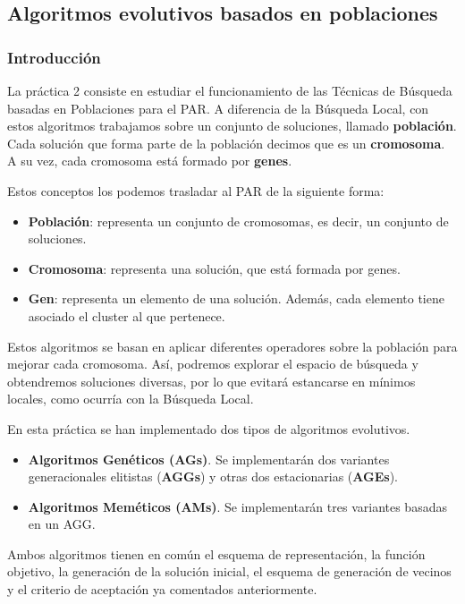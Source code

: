 	\subsection{Algoritmos evolutivos basados en poblaciones}
		\subsubsection{Introducción}
		La práctica 2 consiste en estudiar el funcionamiento de las Técnicas de Búsqueda basadas en Poblaciones para el PAR.
		A diferencia de la Búsqueda Local, con estos algoritmos trabajamos sobre un conjunto de soluciones, llamado \textbf{población}.
		Cada solución que forma parte de la población decimos que es un \textbf{cromosoma}. A su vez, cada cromosoma está formado por \textbf{genes}.
		

		Estos conceptos los podemos trasladar al PAR de la siguiente forma:

		\begin{itemize}
			\item \textbf{Población}: representa un conjunto de cromosomas, es decir, un conjunto de soluciones.
			\item \textbf{Cromosoma}: representa una solución, que está formada por genes.
			\item \textbf{Gen}: representa un elemento de una solución. Además, cada elemento tiene asociado el cluster al que pertenece.
		\end{itemize}

		Estos algoritmos se basan en aplicar diferentes operadores sobre la población para mejorar cada cromosoma. Así, podremos 
		explorar el espacio de búsqueda y obtendremos soluciones diversas, por lo que evitará estancarse en mínimos locales, como ocurría con la
		Búsqueda Local.

		En esta práctica se han implementado dos tipos de algoritmos evolutivos.

		\begin{itemize}
			\item \textbf{Algoritmos Genéticos (AGs)}. Se implementarán dos variantes generacionales elitistas (\textbf{AGGs}) y otras dos estacionarias (\textbf{AGEs}).
			\item \textbf{Algoritmos Meméticos (AMs)}. Se implementarán tres variantes basadas en un AGG.
		\end{itemize}

		Ambos algoritmos tienen en común el esquema de representación, la función objetivo, la generación de la solución inicial, el esquema de generación 
		de vecinos y el criterio de aceptación ya comentados anteriormente.

